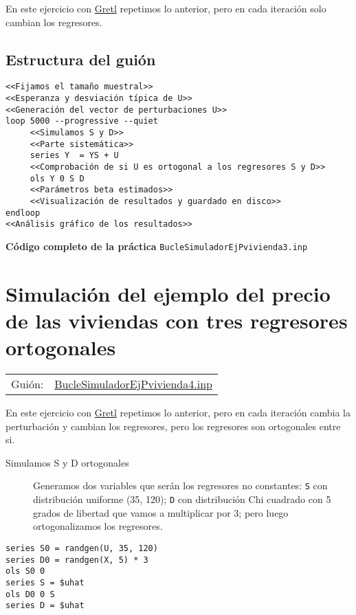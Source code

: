 \documentclass[11pt]{article}
\begin{document}
En este ejercicio con \href{https://gretl.sourceforge.net/es.html}{Gretl} repetimos lo anterior, pero en cada
iteración solo cambian los regresores.

\subsection{Estructura del guión}
\label{sec:org8f44412}

\begin{verbatim}
<<Fijamos el tamaño muestral>>
<<Esperanza y desviación típica de U>>
<<Generación del vector de perturbaciones U>>
loop 5000 --progressive --quiet
     <<Simulamos S y D>>
     <<Parte sistemática>>
     series Y  = YS + U
     <<Comprobación de si U es ortogonal a los regresores S y D>>
     ols Y 0 S D
     <<Parámetros beta estimados>>
     <<Visualización de resultados y guardado en disco>>
endloop
<<Análisis gráfico de los resultados>>
\end{verbatim}

\noindent
\textbf{Código completo de la práctica} \texttt{BucleSimuladorEjPvivienda3.inp}
\vspace{10pt}

\clearpage


\section{Simulación del ejemplo del precio de las viviendas con tres regresores ortogonales}
\label{sec:org9428727}

\begin{center}
\begin{tabular}{ll}
Guión: & \href{https://github.com/mbujosab/Ectr/tree/master/Practicas/Gretl/scripts/BucleSimuladorEjPvivienda4.inp}{BucleSimuladorEjPvivienda4.inp}\\[0pt]
\end{tabular}
\end{center}

En este ejercicio con \href{https://gretl.sourceforge.net/es.html}{Gretl} repetimos lo anterior, pero en cada
iteración cambia la perturbación y cambian los regresores, pero los
regresores son ortogonales entre si.

\begin{description}
\item[{Simulamos S y D ortogonales}] Generamos dos variables que serán los
regresores no constantes: \texttt{S} con distribución uniforme (35, 120);
\texttt{D} con distribución Chi cuadrado con 5 grados de libertad que vamos
a multiplicar por 3; pero luego ortogonalizamos los regresores.
\end{description}
\begin{verbatim}
series S0 = randgen(U, 35, 120)
series D0 = randgen(X, 5) * 3
ols S0 0
series S = $uhat
ols D0 0 S
series D = $uhat
\end{verbatim}
\end{document}
